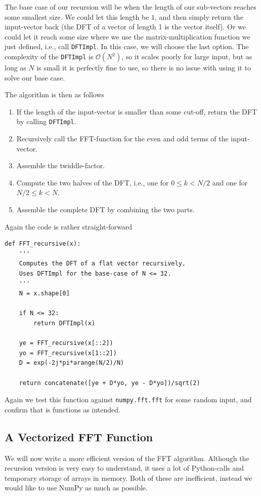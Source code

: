 \documentclass[a4paper, 11pt, notitlepage, english]{article}
\begin{document}
The base case of our recursion will be when the length of our sub-vectors reaches some smallest size. We could let this length be $1$, and then simply return the input-vector back (the DFT of a vector of length 1 is the vector itself). Or we could let it reach some size where we use the matrix-multiplication function we just defined, i.e., call \verb+DFTImpl+. In this case, we will choose the last option. The complexity of the \verb+DFTImpl+ is $\mathcal{O}(N^2)$, so it scales poorly for large input, but as long as $N$ is small it is perfectly fine to use, so there is no issue with using it to solve our base case.

The algorithm is then as follows
\begin{enumerate}
    \item If the length of the input-vector is smaller than some cut-off, return the DFT by calling \verb+DFTImpl+.
    \item Recursively call the FFT-function for the even and odd terms of the input-vector.
    \item Assemble the twiddle-factor.
    \item Compute the two halves of the DFT, i.e., one for $0\leq k < N/2$ and one for $N/2\leq k < N$.
    \item Assemble the complete DFT by combining the two parts.
\end{enumerate}

Again the code is rather straight-forward

\begin{lstlisting}
def FFT_recursive(x):
    '''
    Computes the DFT of a flat vector recursively. 
    Uses DFTImpl for the base-case of N <= 32.
    '''
    N = x.shape[0]

    if N <= 32:
        return DFTImpl(x)

    ye = FFT_recursive(x[::2])
    yo = FFT_recursive(x[1::2])
    D = exp(-2j*pi*arange(N/2)/N)

    return concatenate([ye + D*yo, ye - D*yo])/sqrt(2)
\end{lstlisting}

Again we test this function against \verb+numpy.fft.fft+ for some random input, and confirm that is functions as intended.

\subsection*{A Vectorized FFT Function}
We will now write a more efficient version of the FFT algorithm. Although the recursion version is very easy to understand, it uses a lot of Python-calls and temporary storage of arrays in memory. Both of these are inefficient, instead we would like to use NumPy as much as possible. 
\end{document}
